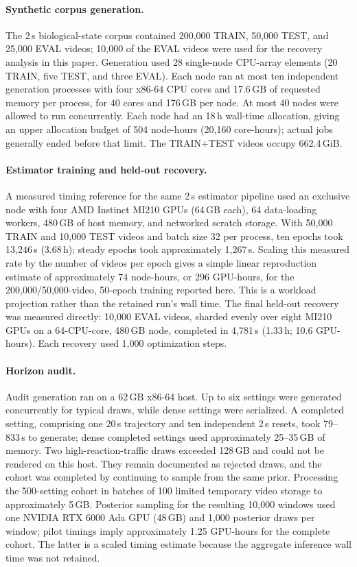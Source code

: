 \documentclass{article}
\begin{document}
\paragraph{Synthetic corpus generation.} The 2\,s biological-state corpus
contained 200,000 TRAIN, 50,000 TEST, and 25,000 EVAL videos; 10,000 of the
EVAL videos were used for the recovery analysis in this paper. Generation used
28 single-node CPU-array elements (20 TRAIN, five TEST, and three EVAL). Each
node ran at most ten independent generation processes with four x86-64 CPU
cores and 17.6\,GB of requested memory per process, for 40 cores and 176\,GB
per node. At most 40 nodes were allowed to run concurrently. Each node had an
18\,h wall-time allocation, giving an upper allocation budget of 504 node-hours
(20,160 core-hours); actual jobs generally ended before that limit. The
TRAIN+TEST videos occupy 662.4\,GiB.

\paragraph{Estimator training and held-out recovery.} A measured timing
reference for the same 2\,s estimator pipeline used an exclusive node with
four AMD Instinct MI210 GPUs (64\,GB each), 64 data-loading workers, 480\,GB
of host memory, and networked scratch storage. With 50,000 TRAIN and 10,000
TEST videos and batch size 32 per process, ten epochs took 13,246\,s
(3.68\,h); steady epochs took approximately 1,267\,s. Scaling this measured
rate by the number of videos per epoch gives a simple linear reproduction
estimate of approximately 74 node-hours, or 296 GPU-hours, for the
200,000/50,000-video, 50-epoch training reported here. This is a workload
projection rather than the retained run's wall time. The final held-out
recovery was measured directly: 10,000 EVAL videos, sharded evenly over eight
MI210 GPUs on a 64-CPU-core, 480\,GB node, completed in 4,781\,s (1.33\,h;
10.6 GPU-hours). Each recovery used 1,000 optimization steps.

\paragraph{Horizon audit.} Audit generation ran on a 62\,GB x86-64 host. Up
to six settings were generated concurrently for typical draws, while dense
settings were serialized. A completed setting, comprising one 20\,s
trajectory and ten independent 2\,s resets, took 79--833\,s to generate;
dense completed settings used approximately 25--35\,GB of memory. Two
high-reaction-traffic draws exceeded 128\,GB and could not be rendered on this
host. They remain documented as rejected draws, and the cohort was completed by
continuing to sample from the same prior. Processing the 500-setting cohort in batches of
100 limited temporary video storage to approximately 5\,GB. Posterior sampling
for the resulting 10,000 windows used one NVIDIA RTX 6000 Ada GPU (48\,GB) and
1,000 posterior draws per window; pilot timings imply approximately 1.25 GPU-hours
for the complete cohort. The latter is a scaled timing estimate because the
aggregate inference wall time was not retained.
\end{document}

